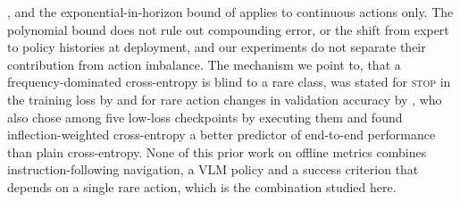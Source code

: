 \citep{foster2024behavior}, and the exponential-in-horizon bound of \citet{simchowitz2025pitfalls}
applies to continuous actions only. The polynomial bound does not rule out compounding error, or
the shift from expert to policy histories at deployment, and our experiments do not separate their
contribution from action imbalance. The mechanism we point to, that a frequency-dominated
cross-entropy is blind to a rare class, was stated for \textsc{stop} in the training loss by
\citet{xiang2020l2stop} and for rare action changes in validation accuracy by
\citet{wijmans2019eqa}, who also chose among five low-loss checkpoints by executing them and found
inflection-weighted cross-entropy a better predictor of end-to-end performance than plain
cross-entropy. None of this prior work on offline metrics combines instruction-following navigation,
a VLM policy and a success criterion that depends on a single rare action, which is the combination
studied here.

